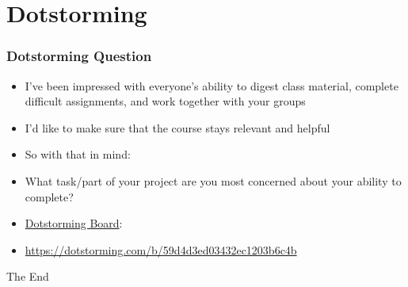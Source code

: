\documentclass[14pt,handout]{beamer}
\begin{document}
\section{Dotstorming}

\begin{frame}
\frametitle{Dotstorming Question}
\begin{itemize}
	\small
	\item<1-> I've been impressed with everyone's ability to digest class material, complete difficult assignments, and work together with your groups
	\item<2-> I'd like to make sure that the course stays relevant and helpful
	\item<3-> So with that in mind:  
	\item<3-> What task/part of your project are you most concerned about your ability to complete?
	\item<3-> \href{https://dotstorming.com/b/59d4d3ed03432ec1203b6c4b}{Dotstorming Board}:
	\item<3-> \href{https://dotstorming.com/b/59d4d3ed03432ec1203b6c4b}{https://dotstorming.com/b/59d4d3ed03432ec1203b6c4b}
\end{itemize}
\end{frame}



\begin{frame}
\Huge{\centerline{The End}}
\end{frame}

\end{document}
